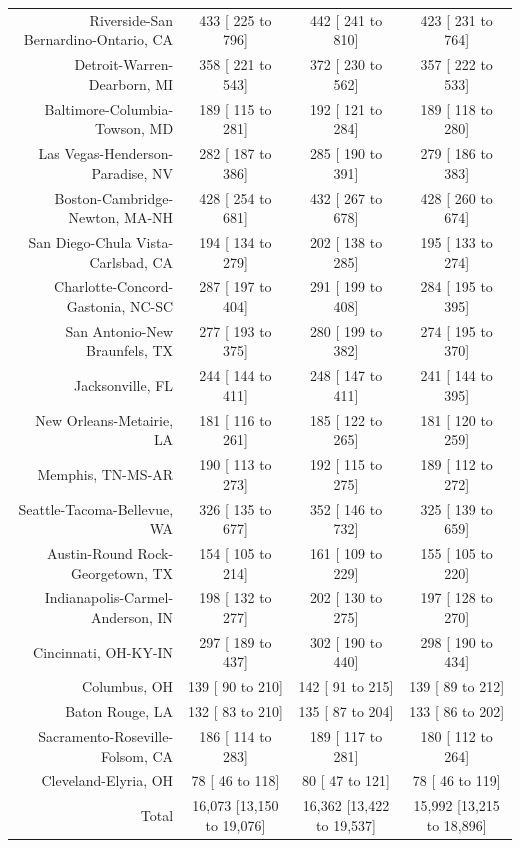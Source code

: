 \documentclass{article}
\begin{document}
\begin{table}[H]
\begin{tabular}{|r|c|c|c|}
		Riverside-San Bernardino-Ontario, CA &    433 [   225 to    796] &    442 [   241 to    810] &    423 [   231 to    764]\\
		Detroit-Warren-Dearborn, MI &    358 [   221 to    543] &    372 [   230 to    562] &    357 [   222 to    533]\\
		Baltimore-Columbia-Towson, MD &    189 [   115 to    281] &    192 [   121 to    284] &    189 [   118 to    280]\\
		Las Vegas-Henderson-Paradise, NV &    282 [   187 to    386] &    285 [   190 to    391] &    279 [   186 to    383]\\
		Boston-Cambridge-Newton, MA-NH &    428 [   254 to    681] &    432 [   267 to    678] &    428 [   260 to    674]\\
		San Diego-Chula Vista-Carlsbad, CA &    194 [   134 to    279] &    202 [   138 to    285] &    195 [   133 to    274]\\
		Charlotte-Concord-Gastonia, NC-SC &    287 [   197 to    404] &    291 [   199 to    408] &    284 [   195 to    395]\\
		San Antonio-New Braunfels, TX &    277 [   193 to    375] &    280 [   199 to    382] &    274 [   195 to    370]\\
		Jacksonville, FL &    244 [   144 to    411] &    248 [   147 to    411] &    241 [   144 to    395]\\
		New Orleans-Metairie, LA &    181 [   116 to    261] &    185 [   122 to    265] &    181 [   120 to    259]\\
		Memphis, TN-MS-AR &    190 [   113 to    273] &    192 [   115 to    275] &    189 [   112 to    272]\\
		Seattle-Tacoma-Bellevue, WA &    326 [   135 to    677] &    352 [   146 to    732] &    325 [   139 to    659]\\
		Austin-Round Rock-Georgetown, TX &    154 [   105 to    214] &    161 [   109 to    229] &    155 [   105 to    220]\\
		Indianapolis-Carmel-Anderson, IN &    198 [   132 to    277] &    202 [   130 to    275] &    197 [   128 to    270]\\
		Cincinnati, OH-KY-IN &    297 [   189 to    437] &    302 [   190 to    440] &    298 [   190 to    434]\\
		Columbus, OH &    139 [    90 to    210] &    142 [    91 to    215] &    139 [    89 to    212]\\
		Baton Rouge, LA &    132 [    83 to    210] &    135 [    87 to    204] &    133 [    86 to    202]\\
		Sacramento-Roseville-Folsom, CA &    186 [   114 to    283] &    189 [   117 to    281] &    180 [   112 to    264]\\
		Cleveland-Elyria, OH &     78 [    46 to    118] &     80 [    47 to    121] &     78 [    46 to    119]\\
		
		\hline
		Total & 16,073 [13,150 to 19,076] & 16,362 [13,422 to 19,537] & 15,992 [13,215 to 18,896]\\
		
		\hline
	\end{tabular}
\end{table}
\end{document}
